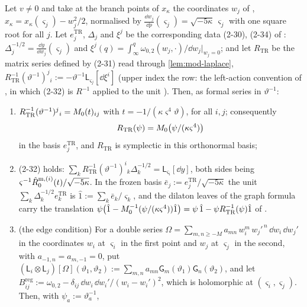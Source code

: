 \begin{prop}
\label{prop:mod-Rtr}
Let $v\neq 0$ and take at the branch points of $x_\kappa$ the coordinates $w_j$ of \cite[\S2.6]{Dunin-Barkowski:2015caa}, $x_\kappa=x_\kappa(\varsigma_j)-w_j^2/2$, normalised by $\frac{\dd w_j}{\dd p}(\varsigma_j)=\sqrt{-5\kappa}\,\varsigma_j$ with one square root for all $j$. Let $e^{\mathrm{TR}}_j$, $\Delta_j$ and $\xi^j$ be the corresponding data (2-30), (2-34) of \cite[\S2.6]{Dunin-Barkowski:2015caa}: $\Delta_j^{-1/2}=\frac{\dd y}{\dd w_j}(\varsigma_j)$ and $\xi^j(q)=\int_\infty^q\omega_{0,2}(w_j,\cdot)/\dd w_j|_{w_j=0}$; and let $R_{\mathrm{TR}}$ be the matrix series defined by (2-31) read through \cref{lem:mod-laplace}, $R_{\mathrm{TR}}^{-1}(\vartheta^{-1})^j{}_i:=-\vartheta^{-1}\mathsf L_{\varsigma_j}[\dd\xi^i]$ (upper index the row: the left-action convention of \cite[Remark~2.1]{Dunin-Barkowski:2015caa}, in which (2-32) is $R^{-1}$ applied to the unit \cite[Section~3]{Dunin-Barkowski:2015caa}). Then, as formal series in $\vartheta^{-1}$:
\begin{enumerate}
\item $R_{\mathrm{TR}}^{-1}(\vartheta^{-1})^j{}_i=M_{0}(t)_{ij}$ with $t=-1/(\kappa\varsigma^4\vartheta)$, for all $i,j$; consequently
\begin{equation}
\label{eq:mod-Rtr}
R_{\mathrm{TR}}(\psi)=M_{0}\big(\psi/(\kappa\varsigma^4)\big)
\end{equation}
in the basis $e^{\mathrm{TR}}_j$, and $R_{\mathrm{TR}}$ is symplectic in this orthonormal basis;
\item (2-32) holds: $\sum_kR_{\mathrm{TR}}^{-1}(\vartheta^{-1})^i{}_k\Delta_k^{-1/2}=\mathsf L_{\varsigma_i}[\dd y]$, both sides being $\varsigma^{-1}\hat{R}^{\mathrm m,(i)}_0(t)/\sqrt{-5\kappa}$. In the frozen basis $\bar e_j:=e^{\mathrm{TR}}_j/\sqrt{-5\kappa}$ the unit $\sum_k\Delta_k^{-1/2}e^{\mathrm{TR}}_k$ is $\hat 1:=\sum_k\bar e_k/\varsigma_k$, and the dilaton leaves of the graph formula carry the translation $\psi\big(\hat 1-M_{0}^{-1}(\psi/(\kappa\varsigma^4))\hat 1\big)=\psi\,\hat 1-\psi R_{\mathrm{TR}}^{-1}(\psi)\hat 1$ of \cite[Def.~2.13]{PPZ15}.
\item (the edge condition) For a double series $\Omega=\sum_{m,n\geq-M}a_{mn}\,w_i^m\,w_j'^{\,n}\,\dd w_i\,\dd w_j'$ in the coordinates $w_i$ at $\varsigma_i$ in the first point and $w_j$ at $\varsigma_j$ in the second, with $a_{-1,n}=a_{m,-1}=0$, put $(\mathsf L_i\otimes\mathsf L_j)[\Omega](\vartheta_1,\vartheta_2):=\sum_{m,n}a_{mn}\mathsf G_m(\vartheta_1)\mathsf G_n(\vartheta_2)$, and let $B^{\mathrm{reg}}_{ij}:=\omega_{0,2}-\delta_{ij}\,\dd w_i\,\dd w_i'/(w_i-w_i')^2$, which is holomorphic at $(\varsigma_i,\varsigma_j)$. Then, with $\psi_a:=\vartheta_a^{-1}$,

\end{enumerate}
\end{prop}
